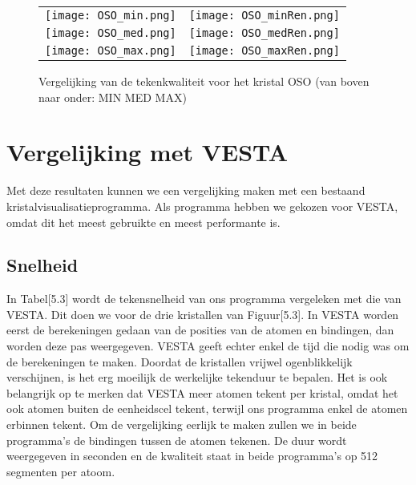 \begin{figure}[H]
\begin{center}
\begin{tabular}{l|l}

\texttt{[image: OSO\_min.png]}
&
\texttt{[image: OSO\_minRen.png]}
\\ 
\texttt{[image: OSO\_med.png]}
&
\texttt{[image: OSO\_medRen.png]}
\\ 
\texttt{[image: OSO\_max.png]}
&
\texttt{[image: OSO\_maxRen.png]}
\end{tabular}
\end{center}
\caption{Vergelijking van de tekenkwaliteit voor het kristal OSO (van boven naar onder: MIN MED MAX)}
\end{figure}



\section{Vergelijking met VESTA}  
Met deze resultaten kunnen we een vergelijking maken met een bestaand kristalvisualisatieprogramma. Als programma hebben we gekozen voor VESTA, omdat dit het meest gebruikte en meest performante is.

\subsection{Snelheid}
In Tabel[5.3] wordt de tekensnelheid van ons programma vergeleken met die van VESTA. Dit doen we voor de drie kristallen van Figuur[5.3]. In VESTA worden eerst de berekeningen gedaan van de posities van de atomen en bindingen, dan worden deze pas weergegeven. VESTA geeft echter enkel de tijd die nodig was om de berekeningen te maken. Doordat de kristallen vrijwel ogenblikkelijk verschijnen, is het erg moeilijk de werkelijke tekenduur te bepalen. Het is ook belangrijk op te merken dat VESTA meer atomen tekent per kristal, omdat het ook atomen buiten de eenheidscel tekent, terwijl ons programma enkel de atomen erbinnen tekent. Om de vergelijking eerlijk te maken zullen we in beide programma's de bindingen tussen de atomen tekenen. De duur wordt weergegeven in seconden en de kwaliteit staat in beide programma's op 512 segmenten  per atoom.
\par

